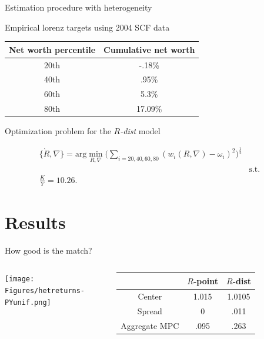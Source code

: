 \documentclass{beamer}
\begin{document}
\begin{frame}{Estimation procedure with heterogeneity}

\small
\par Empirical lorenz targets using 2004 SCF data \vspace{2mm}

\centering
\begin{tabular}{|c|c|}
\hline
Net worth percentile & Cumulative net worth \\
\hline
20th & -.18\%  \\
40th &  .95\% \\
60th &  5.3\% \\
80th &  17.09\% \\
\hline
\end{tabular}

\begin{flushleft}
\par Optimization problem for the $R$\textit{-dist} model 
\end{flushleft}

\vspace{-7.5mm}
 \begin{eqnarray*}
  \{\grave{R}, \nabla\} = \text{arg}\min_{R, \nabla} \bigg( \sum_{i=20, 40, 60, 80} (w_{i}(R, \nabla)-\omega_i )^{2} \bigg)^{\frac{1}{2}}\\
  &\text{s.t.}& \\
  \frac{K}{Y} = 10.26. %
\end{eqnarray*}


\end{frame}

\section{Results}

\begin{frame}{How good is the match?}
    
    \begin{columns}
    \centering
    \texttt{[image: Figures/hetreturns-PYunif.png]}
    
    \hspace{-5mm}
    \centering
    
    \begin{tabular}{|c|c|c|}

\hline
& $R$-point & $R$-dist \\
\hline
Center & 1.015 & 1.0105  \\
Spread & 0  &  .011  \\
Aggregate MPC & .095 &  .263 \\
\hline
\end{tabular}
    
  \end{columns}
    
\end{frame}
\end{document}

